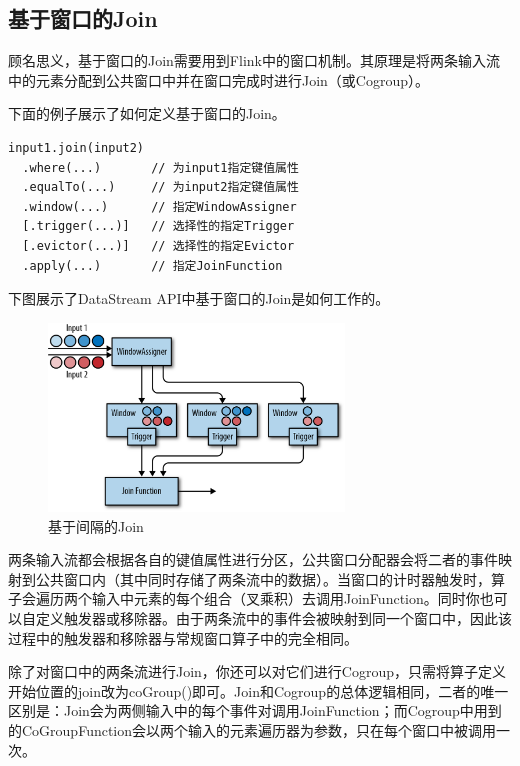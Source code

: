 \documentclass[cn,11pt,chinese]{elegantbook}
\begin{document}
\subsection{基于窗口的Join}

顾名思义，基于窗口的Join需要用到Flink中的窗口机制。其原理是将两条输入流中的元素分配到公共窗口中并在窗口完成时进行Join（或Cogroup）。

下面的例子展示了如何定义基于窗口的Join。

\begin{verbatim}
input1.join(input2)
  .where(...)       // 为input1指定键值属性
  .equalTo(...)     // 为input2指定键值属性
  .window(...)      // 指定WindowAssigner
  [.trigger(...)]   // 选择性的指定Trigger
  [.evictor(...)]   // 选择性的指定Evictor
  .apply(...)       // 指定JoinFunction
\end{verbatim}

下图展示了DataStream API中基于窗口的Join是如何工作的。

\begin{figure}[htbp]
    \centering
    \includegraphics[width=0.7\textwidth]{images/spaf_0608.png}
    \caption{基于间隔的Join}
\end{figure}

两条输入流都会根据各自的键值属性进行分区，公共窗口分配器会将二者的事件映射到公共窗口内（其中同时存储了两条流中的数据）。当窗口的计时器触发时，算子会遍历两个输入中元素的每个组合（叉乘积）去调用JoinFunction。同时你也可以自定义触发器或移除器。由于两条流中的事件会被映射到同一个窗口中，因此该过程中的触发器和移除器与常规窗口算子中的完全相同。

除了对窗口中的两条流进行Join，你还可以对它们进行Cogroup，只需将算子定义开始位置的join改为coGroup()即可。Join和Cogroup的总体逻辑相同，二者的唯一区别是：Join会为两侧输入中的每个事件对调用JoinFunction；而Cogroup中用到的CoGroupFunction会以两个输入的元素遍历器为参数，只在每个窗口中被调用一次。
\end{document}
